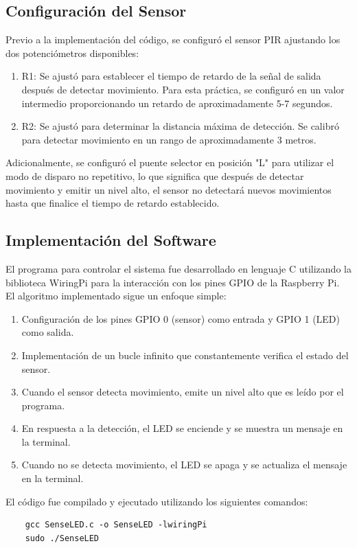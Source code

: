 \subsection{Configuración del Sensor}
Previo a la implementación del código, se configuró el sensor PIR ajustando los dos potenciómetros disponibles:

\begin{enumerate}
	\item R1: Se ajustó para establecer el tiempo de retardo de la señal de salida después de detectar movimiento. Para esta práctica, se configuró en un valor intermedio proporcionando un retardo de aproximadamente 5-7 segundos.
	\item R2: Se ajustó para determinar la distancia máxima de detección. Se calibró para detectar movimiento en un rango de aproximadamente 3 metros.
\end{enumerate}

Adicionalmente, se configuró el puente selector en posición "L" para utilizar el modo de disparo no repetitivo, lo que significa que después de detectar movimiento y emitir un nivel alto, el sensor no detectará nuevos movimientos hasta que finalice el tiempo de retardo establecido.

\subsection{Implementación del Software}
El programa para controlar el sistema fue desarrollado en lenguaje C utilizando la biblioteca WiringPi para la interacción con los pines GPIO de la Raspberry Pi. El algoritmo implementado sigue un enfoque simple:

\begin{enumerate}
	\item Configuración de los pines GPIO 0 (sensor) como entrada y GPIO 1 (LED) como salida.
	\item Implementación de un bucle infinito que constantemente verifica el estado del sensor.
	\item Cuando el sensor detecta movimiento, emite un nivel alto que es leído por el programa.
	\item En respuesta a la detección, el LED se enciende y se muestra un mensaje en la terminal.
	\item Cuando no se detecta movimiento, el LED se apaga y se actualiza el mensaje en la terminal.
\end{enumerate}

El código fue compilado y ejecutado utilizando los siguientes comandos:
\begin{verbatim}
	gcc SenseLED.c -o SenseLED -lwiringPi
	sudo ./SenseLED
\end{verbatim}


